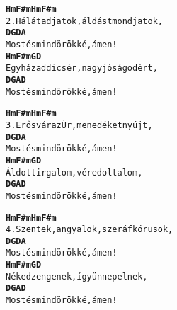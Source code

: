 \newpage
{}
\kottastart
{}
\kottaend
\begin{minipage}{\textwidth}
\begin{multicols}{2}
\begin{minipage}{\textwidth}
\begin{alltt}
\textbf{    Hm        F#m Hm            F#m}
2. Hálát adjatok, áldást mondjatok,
\textbf{    D       G          D A}
   Most és mindörökké, ámen!
\textbf{   Hm           F#m  G          D}
   Egyházad dicsér, nagy jóságodért,
\textbf{    D       G          A D}
   Most és mindörökké, ámen!
\end{alltt}
\vspace{0.0cm}
\versszakspacing
\end{minipage}
\begin{minipage}{\textwidth}
\begin{alltt}
\textbf{   Hm          F#m  Hm         F#m}
3. Erős vár az Úr, menedéket nyújt,
\textbf{    D       G          D A}
   Most és mindörökké, ámen!
\textbf{   Hm           F#m G         D}
   Áldott irgalom, véred oltalom,
\textbf{    D       G          A D}
   Most és mindörökké, ámen!
\end{alltt}
\vspace{0.0cm}
\versszakspacing
\end{minipage}
\begin{minipage}{\textwidth}
\begin{alltt}
\textbf{     Hm           F#m   Hm        F#m}
4. Szentek, angyalok, szeráf kórusok,
\textbf{    D       G          D A}
   Most és mindörökké, ámen!
\textbf{    Hm         F#m G           D}
   Néked zengenek, így ünnepelnek,
\textbf{    D       G          A D}
   Most és mindörökké, ámen!
\end{alltt}
\vspace{0.0cm}
\versszakspacing
\end{minipage}
\vspace{0.2cm}
\end{multicols}
\end{minipage}

